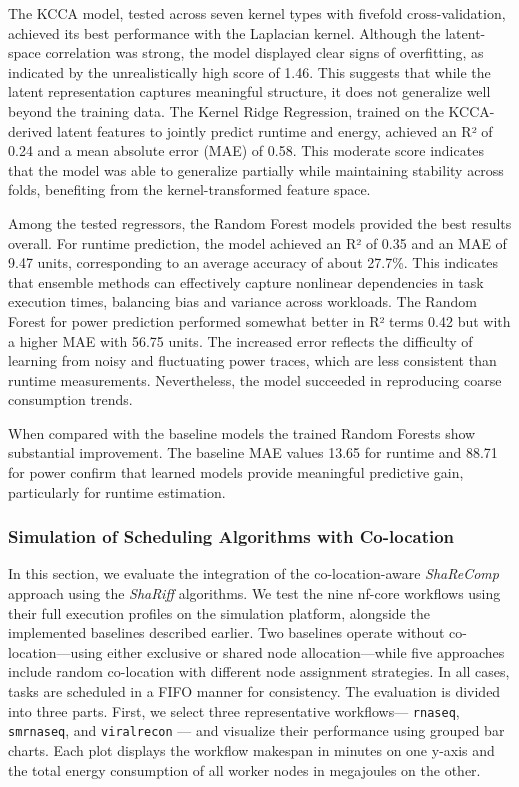 The KCCA model, tested across seven kernel types with fivefold cross-validation, achieved its best performance with the Laplacian kernel. Although the latent-space correlation was strong, the model displayed clear signs of overfitting, as indicated by the unrealistically high score of 1.46. This suggests that while the latent representation captures meaningful structure, it does not generalize well beyond the training data.
The Kernel Ridge Regression, trained on the KCCA-derived latent features to jointly predict runtime and energy, achieved an R² of 0.24 and a mean absolute error (MAE) of 0.58. This moderate score indicates that the model was able to generalize partially while maintaining stability across folds, benefiting from the kernel-transformed feature space.

Among the tested regressors, the Random Forest models provided the best results overall. For runtime prediction, the model achieved an R² of 0.35 and an MAE of 9.47 units, corresponding to an average accuracy of about 27.7\%. This indicates that ensemble methods can effectively capture nonlinear dependencies in task execution times, balancing bias and variance across workloads. The Random Forest for power prediction performed somewhat better in R² terms 0.42 but with a higher MAE with 56.75 units. The increased error reflects the difficulty of learning from noisy and fluctuating power traces, which are less consistent than runtime measurements. Nevertheless, the model succeeded in reproducing coarse consumption trends.

When compared with the baseline models the trained Random Forests show substantial improvement. The baseline MAE values 13.65 for runtime and 88.71 for power confirm that learned models provide meaningful predictive gain, particularly for runtime estimation.

\subsubsection{Simulation of Scheduling Algorithms with Co-location}
\label{sec:workflow_makespan_and_energy_consumption}


In this section, we evaluate the integration of the co-location-aware \textit{ShaReComp} approach using the \textit{ShaRiff} algorithms. We test the nine nf-core workflows using their full execution profiles on the simulation platform, alongside the implemented baselines described earlier. Two baselines operate without co-location—using either exclusive or shared node allocation—while five approaches include random co-location with different node assignment strategies. In all cases, tasks are scheduled in a FIFO manner for consistency.
The evaluation is divided into three parts. First, we select three representative workflows— \texttt{rnaseq}, \texttt{smrnaseq}, and \texttt{viralrecon} — and visualize their performance using grouped bar charts. Each plot displays the workflow makespan in minutes on one y-axis and the total energy consumption of all worker nodes in megajoules on the other.

